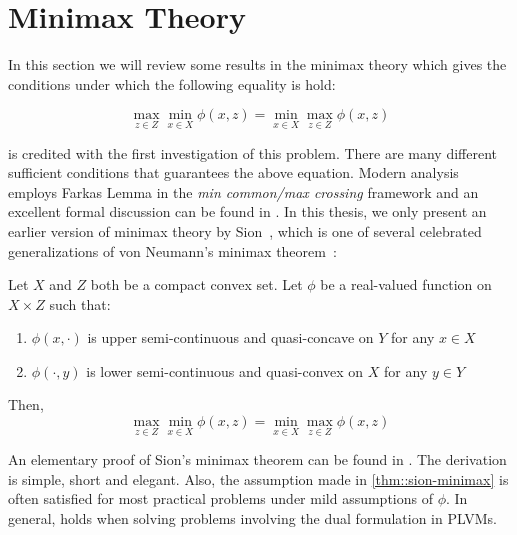 \section{Minimax Theory}

In this section we will review some results in the minimax theory which gives
the conditions under which the following equality is hold:

\begin{equation}
 \max\limits_{z \in Z} \min\limits_{x \in X} \phi(x,z) =
 \min\limits_{x \in X} \max\limits_{z \in Z} \phi(x,z)  \label{eq::minimax}
\end{equation}

\citeauthor{neumann1928theorie} is credited with the first investigation of this
problem.  There are many different sufficient conditions that guarantees the
above equation. Modern analysis employs Farkas Lemma in the \emph{min common/max
crossing} framework and an excellent formal discussion can be found in
\cite{bertsekas2003convex}. In this thesis, we only present an earlier version
of minimax theory by Sion~\cite{sion1958general}, which is one of several
celebrated generalizations of von Neumann's minimax
theorem~\cite{neumann1928theorie}:

\begin{thm}\label{thm::sion-minimax}
  Let $X$ and $Z$ both be a compact convex set. Let $\phi$ be a real-valued
  function on $X \times Z$ such that:
  \begin{enumerate}
    \item $\phi(x, \cdot)$ is upper semi-continuous and quasi-concave on $Y$ for
      any $x \in X$
    \item $\phi(\cdot, y)$ is lower semi-continuous and quasi-convex on $X$ for
      any $y \in Y$
  \end{enumerate}
  Then,
  $$ \max\limits_{z \in Z} \min\limits_{x \in X} \phi(x,z) =
     \min\limits_{x \in X} \max\limits_{z \in Z} \phi(x,z)  $$
\end{thm}

An elementary proof of Sion's minimax theorem can be found in
\cite{komiya1988elementary}. The derivation is simple, short and elegant. Also,
the assumption made in \cref{thm::sion-minimax} is often satisfied for most
practical problems under mild assumptions of $\phi$. In general,
 holds when solving problems involving the dual formulation in
PLVMs.

